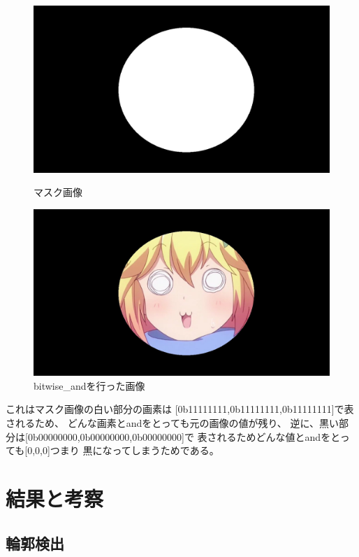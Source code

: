 \documentclass[dvipdfmx]{jsarticle}
\begin{document}
\begin{figure}[htbp]
  \begin{minipage}{0.5\hsize}
    \centering
    \includegraphics[width=0.9\hsize]{../pic/black.jpg}
    \caption{マスク画像}
    \label{fig:mask1}
  \end{minipage}
  \begin{minipage}{0.5\hsize}
    \centering
    \includegraphics[width=0.9\hsize]{../pic/tapu_icon.jpg}
    \caption{bitwise\_andを行った画像}
    \label{fig:masked1}
  \end{minipage}
\end{figure}

これはマスク画像の白い部分の画素は
[0b11111111,0b11111111,0b11111111]で表されるため、
どんな画素とandをとっても元の画像の値が残り、
逆に、黒い部分は[0b00000000,0b00000000,0b00000000]で
表されるためどんな値とandをとっても[0,0,0]つまり
黒になってしまうためである。


\section{結果と考察}

\subsection{輪郭検出}
\end{document}
